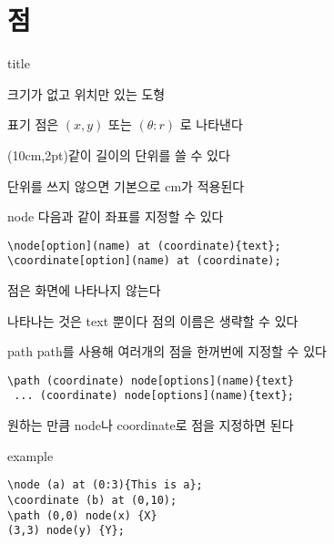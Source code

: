 \documentclass[12pt]{beamer}
\newcommand{\MyBeginSection}[1]{
	\begin{frame}
		\vfill
		\centering
		\begin{beamercolorbox}[sep=8pt,center,shadow=true,rounded=true]{title}
			\usebeamerfont{title}\insertsectionhead\par
		\end{beamercolorbox}
		\footnotesize{#1}
		\vfill
	\end{frame}
}
\begin{document}
\AtBeginSection[]{}

\section{점}
\MyBeginSection{크기가 없고 위치만 있는 도형}

\begin{frame}{\secname}{표기}
	점은 \((x,y)\) 또는 \((\theta:r)\) 로 나타낸다
	
	\vfill
	(10cm,2pt)같이 길이의 단위를 쓸 수 있다
	
	단위를 쓰지 않으면 기본으로 cm가 적용된다
\end{frame}

\begin{frame}[fragile]{\secname}{node}
	다음과 같이 좌표를 지정할 수 있다
	\begin{lstlisting}
\node[option](name) at (coordinate){text};
\coordinate[option](name) at (coordinate);
	\end{lstlisting}
	\vfill
	점은 화면에 나타나지 않는다
	
	나타나는 것은 text 뿐이다
	\vfill
	점의 이름은 생략할 수 있다
	
\end{frame}

\begin{frame}[fragile]{\secname}{path}
	path를 사용해 여러개의 점을 한꺼번에 지정할 수 있다
	
	\begin{lstlisting}
\path (coordinate) node[options](name){text}
 ... (coordinate) node[options](name){text};
	\end{lstlisting}
	\vfill
	원하는 만큼 node나 coordinate로 점을 지정하면 된다

\end{frame}

\begin{frame}[fragile]{\secname}{example}
	\begin{lstlisting}
\node (a) at (0:3){This is a};
\coordinate (b) at (0,10);
\path (0,0) node(x) {X}
(3,3) node(y) {Y};
	\end{lstlisting}
	
\begin{center}
\end{center}

\end{frame}
\end{document}
